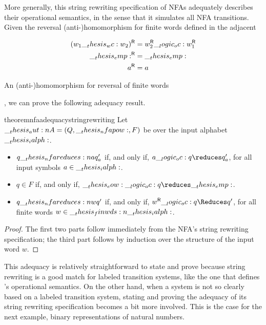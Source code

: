 More generally, this string rewriting specification of \acp{NFA} adequately describes their operational semantics, in the sense that it simulates all \ac{NFA} transitions.
Given the reversal (anti-)\-homo\-morph\-ism for finite words defined in the adjacent %
\begin{marginfigure}
  \begin{align*}
    \rev*{w_1 \wc w_2} &= \rev{w_2} \oc \rev{w_1} \\
    \rev{\emp} &= \emp \\
    \rev{a} &= a
  \end{align*}
  \caption{An (anti-)\-homo\-morph\-ism for reversal of finite words}\label{fig:string-rewriting:reversal}
\end{marginfigure}%
, we can prove the following adequacy result.
\begin{restatable}[
  name=Adequacy of \ac*{NFA} specification,
  label=thm:nfa-adequacy-string-rewriting
]{theorem}{nfaadequacystringrewriting}
  Let $\__thesis_aut:n {A} = (Q, \__thesis_nfapow:, F)$ be  over the input alphabet $\__thesis_ialph:$.
  \begin{itemize}[nosep]
  \item
    $q \nfareduces[a] q'_a$ if, and only if, $a \oc q \reduces q'_a$, for all input symbols $a \in \__thesis_ialph:$.
  \item
    $q \in F$ if, and only if, $\eow \oc q \reduces \symacc$.%
  \item
    $q \nfareduces[w] q'$ if, and only if, $\rev{w} \oc q \Reduces q'$, for all finite words $w \in \__thesis_finwds:n {\__thesis_ialph:}$.
  \end{itemize}  
\end{restatable}
\begin{proof}
  The first two parts follow immediately from the \ac{NFA}'s string rewriting specification; the third part follows by induction over the structure of the input word $w$.
\end{proof}

This adequacy  is relatively straightforward to state and prove because string rewriting is a good match for labeled transition systems, like the one that defines 's operational semantics.
On the other hand, when a system is not so clearly based on a labeled transition system, stating and proving the adequacy of its string rewriting specification becomes a bit more involved.
This is the case for the next example, binary representations of natural numbers.

